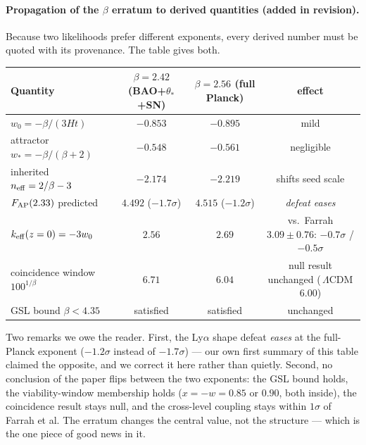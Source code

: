 \documentclass[11pt]{article}
\begin{document}
\paragraph{Propagation of the $\beta$ erratum to derived quantities (added in revision).}
Because two likelihoods prefer different exponents, every derived number must be quoted with its
provenance. The table gives both.

\begin{center}\small
\begin{tabular}{lccc}
\toprule
Quantity & $\beta = 2.42$ (BAO+$\theta_*$+SN) & $\beta = 2.56$ (full Planck) & effect\\
\midrule
$w_0 = -\beta/(3Ht)$ & $-0.853$ & $-0.895$ & mild\\
attractor $w_* = -\beta/(\beta+2)$ & $-0.548$ & $-0.561$ & negligible\\
inherited $n_{\rm eff} = 2/\beta - 3$ & $-2.174$ & $-2.219$ & shifts seed scale\\
$F_{\rm AP}(2.33)$ predicted & $4.492$ ($-1.7\sigma$) & $4.515$ ($-1.2\sigma$) & \emph{defeat eases}\\
$k_{\rm eff}(z=0) = -3w_0$ & $2.56$ & $2.69$ & vs.\ Farrah $3.09 \pm 0.76$: $-0.7\sigma$ / $-0.5\sigma$\\
coincidence window $100^{1/\beta}$ & $6.71$ & $6.04$ & null result unchanged (\,$\Lambda$CDM $6.00$)\\
GSL bound $\beta < 4.35$ & satisfied & satisfied & unchanged\\
\bottomrule
\end{tabular}
\end{center}

\noindent Two remarks we owe the reader. First, the Ly$\alpha$ shape defeat \emph{eases} at the
full-Planck exponent ($-1.2\sigma$ instead of $-1.7\sigma$) --- our own first summary of this table
claimed the opposite, and we correct it here rather than quietly. Second, no conclusion of the
paper flips between the two exponents: the GSL bound holds, the viability-window membership holds
($x = -w = 0.85$ or $0.90$, both inside), the coincidence result stays null, and the cross-level
coupling stays within $1\sigma$ of Farrah et al. The erratum changes the central value, not the
structure --- which is the one piece of good news in it.
\end{document}
